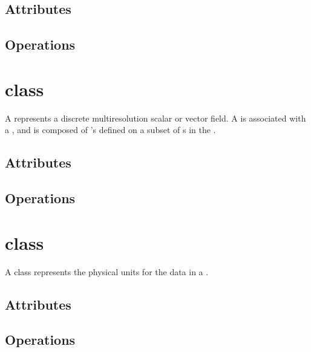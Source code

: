 \documentclass{book}
\begin{document}
\subsection{Attributes}

\subsection{Operations}

\section{ class} \label{ss:field}

A  represents a discrete multiresolution scalar or vector
field.  A  is associated with a , and is
composed of 's defined on a subset of s in the
.

\subsection{Attributes}

\subsection{Operations}

\section{ class}

A  class represents the physical units for the data in a
.

\subsection{Attributes}

\subsection{Operations}

\newpage

\end{document}

